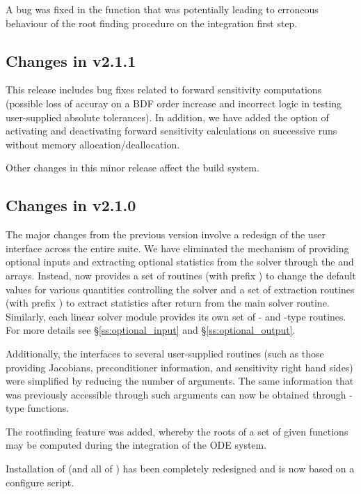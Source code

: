 A bug was fixed in the  function that was potentially
leading to erroneous behaviour of the root finding procedure on the 
integration first step.

\subsection*{Changes in v2.1.1}

This {\cvodes} release includes bug fixes related to forward sensitivity
computations (possible loss of accuray on a BDF order increase and incorrect
logic in testing user-supplied absolute tolerances). 
In addition, we have added the option of activating and deactivating
forward sensitivity calculations on successive {\cvodes} runs without memory
allocation/deallocation.

Other changes in this minor {\sundials} release affect the build system.

\subsection*{Changes in v2.1.0}

The major changes from the previous version involve a redesign of the
user interface across the entire {\sundials} suite. We have eliminated the
mechanism of providing optional inputs and extracting optional statistics 
from the solver through the  and  arrays. Instead,
{\cvodes} now provides a set of routines (with prefix )
to change the default values for various quantities controlling the
solver and a set of extraction routines (with prefix )
to extract statistics after return from the main solver routine.
Similarly, each linear solver module provides its own set of {-}
and {-type} routines. For more details see \S\ref{ss:optional_input}
and \S\ref{ss:optional_output}.

Additionally, the interfaces to several user-supplied routines
(such as those providing Jacobians, preconditioner information, and
sensitivity right hand sides) were simplified by reducing the number
of arguments. The same information that was previously accessible
through such arguments can now be obtained through {-type}
functions.

The rootfinding feature was added, whereby the roots of a set of given
functions may be computed during the integration of the ODE system.

Installation of {\cvodes} (and all of {\sundials}) has been completely 
redesigned and is now based on a configure script.


